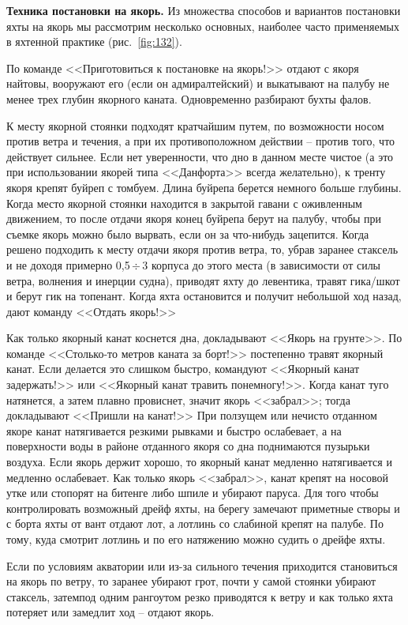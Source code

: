 \documentclass[a4paper, 12pt, twoside, final, book, russian, fittopage, cyremdash]{ncc}
\newcommand{\otdo}{\,\ensuremath{\div}\,}
\newcommand{\ris}[1]{\ref{fig:#1}}
\begin{document}
\textbf{Техника постановки на якорь.} Из множества способов и вариантов постановки яхты на якорь мы рассмотрим несколько основных, наиболее часто применяемых в яхтенной практике (рис.~\ris{132}). 

По команде <<Приготовиться к постановке на якорь!>> отдают с якоря найтовы, вооружают его (если он адмиралтейский) и выкатывают на палубу не менее трех глубин якорного каната. Одновременно разбирают бухты фалов. 

К месту якорной стоянки подходят кратчайшим путем, по возможности носом против ветра и течения, а при их противоположном действии \--- против того, что действует сильнее. Если нет уверенности, что дно в данном месте чистое (а это при использовании якорей типа <<Данфорта>> всегда желательно), к тренту якоря крепят буйреп с томбуем. Длина буйрепа берется немного больше глубины. Когда место якорной стоянки находится в закрытой гавани с оживленным движением, то после отдачи якоря конец буйрепа берут на палубу, чтобы при съемке якорь можно было вырвать, если он за что-нибудь зацепится. Когда решено подходить к месту отдачи якоря против ветра, то, убрав заранее стаксель и не доходя примерно 0,5\otdo 3 корпуса до этого места (в зависимости от силы ветра, волнения и инерции судна), приводят яхту до левентика, травят гика\-/шкот и берут гик на топенант. Когда яхта остановится и получит небольшой ход назад, дают команду <<Отдать якорь!>>

Как только якорный канат коснется дна, докладывают <<Якорь на грунте>>. По команде <<Столько-то метров каната за борт!>> постепенно травят якорный канат. Если делается это слишком быстро, командуют <<Якорный канат задержать!>> или <<Якорный канат травить понемногу!>>. Когда канат туго натянется, а затем плавно провиснет, значит якорь <<забрал>>; тогда докладывают <<Пришли на канат!>> При ползущем или нечисто отданном якоре канат натягивается резкими рывками и быстро ослабевает, а на поверхности воды в районе отданного якоря со дна поднимаются пузырьки воздуха. Если якорь держит хорошо, то якорный канат медленно натягивается и медленно ослабевает. Как только якорь <<забрал>>, канат крепят на носовой утке или стопорят на битенге либо шпиле и убирают паруса. Для того чтобы контролировать возможный дрейф яхты, на берегу замечают приметные створы и с борта яхты от вант отдают лот, а лотлинь со слабиной крепят на палубе. По тому, куда смотрит лотлинь и по его натяжению можно судить о дрейфе яхты.

Если по условиям акватории или из-за сильного течения приходится становиться на якорь по ветру, то заранее убирают грот, почти у самой стоянки убирают стаксель, затемпод одним рангоутом резко приводятся к ветру и как только яхта потеряет или замедлит ход \--- отдают якорь.
\end{document}
